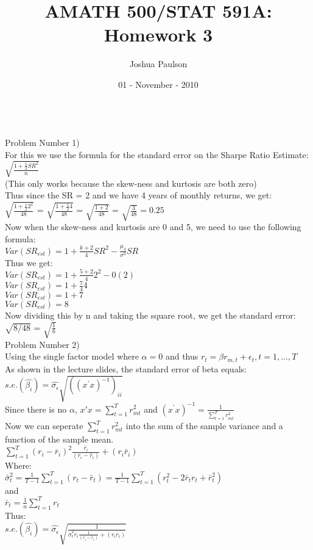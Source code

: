 \documentclass[11pt]{article}
\title{AMATH 500/STAT 591A: Homework 3}
\author{Joshua Paulson}
\date{01 - November - 2010}
\begin{document}
\maketitle{\textbf{}}\\
Problem Number 1)\\
For this we use the formula for the standard error on the Sharpe Ratio Estimate: $\sqrt{\frac{1 + \frac{1}{2} SR^{2}}{n}}$\\
(This only works because the skew-ness and kurtosis are both zero)\\
Thus since the SR = 2 and we have 4 years of monthly returns, we get:\\ $\sqrt{\frac{1 + \frac{1}{2} 2^{2}}{48}}$ = 
$\sqrt{\frac{1 + \frac{1}{2} 4}{48}}$ = 
$\sqrt{\frac{1 + 2}{48}}$ = 
$\sqrt{\frac{3}{48}} = 0.25$\\


Now when the skew-ness and kurtosis are 0 and 5, we need to use the following formula:\\
$Var(SR_{est}) = 1 + \frac{k + 2}{4} SR^{2} - \frac{\mu_{3}}{\sigma^{3}} SR$\\
Thus we get:\\
$Var(SR_{est}) = 1 + \frac{5 + 2}{4} 2^{2} - 0 (2)$\\
$Var(SR_{est}) = 1 + \frac{7}{4} 4 $\\
$Var(SR_{est}) = 1 + 7$\\
$Var(SR_{est}) = 8$\\
Now dividing this by n and taking the square root, we get the standard error:\\
$\sqrt{8/48}$ = $\sqrt{\frac{1}{6}}$\\

Problem Number 2)\\
Using the single factor model where $\alpha = 0$ and thus $r_{t} = \beta r_{m,t} + \epsilon_{t}, t = 1, ..., T$\\
As shown in the lecture slides, the standard error of beta equals:\\
$s.e.(\hat{\beta_{i}}) = \hat{\sigma_{\epsilon}} \sqrt{((x^{'}x)^{-1})_{ii}}$\\
Since there is no $\alpha$, $x'x = \sum_{t = 1}^{T} r_{mt}^{2}$ and $(x^{'}x)^{-1} = \frac{1}{\sum_{t = 1}^{T} r_{mt}^{2}}$\\
Now we can seperate $\sum_{t = 1}^{T} r_{mt}^{2}$ into the sum of the sample variance and a function of the sample mean.\\
$\sum_{t=1}^{T} (r_{i} - \bar{r}_{i})^{2} \frac{\bar{r}_{i}}{(r_{i} - \bar{r}_{i})} + (r_{i} \bar{r}_{i})$\\
Where:\\
$\bar{\sigma}_{t}^{2} = \frac{1}{T-1} \sum_{t=1}^{T} (r_{t} - \bar{r}_{t}) = \frac{1}{T-1} \sum_{t=1}^{T} (r_{t}^{2} - 2\bar{r}_{t} r_{t} + \bar{r}_{t}^{2})$\\
and\\
$\bar{r}_{t} = \frac{1}{n} \sum_{t=1}^{T}r_{t}$\\
Thus:\\
$s.e.(\hat{\beta_{i}}) = \hat{\sigma_{\epsilon}} \sqrt{\frac{1}{\bar{\sigma}_{t}^{2} \bar{r}_{i} \frac{1}{(r_{i} - \bar{r}_{i})} + (r_{i} \bar{r}_{i})}}$\\
\end{document}
